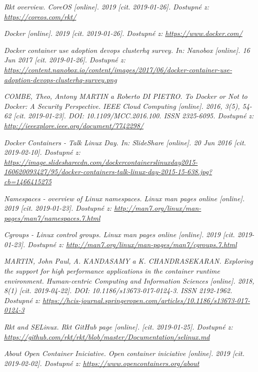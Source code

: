 \begin{thebibliography}{10}
	\emph{Rkt overview. CoreOS [online]. 2019 [cit. 2019-01-26]. Dostupné z: \url{https://coreos.com/rkt/}}

	\emph{Docker [online]. 2019 [cit. 2019-01-26]. Dostupné z: \url{https://www.docker.com/}}

	\emph{Docker container use adoption devops clusterhq survey. In: Nanobox [online]. 16 Jun 2017 [cit. 2019-01-26]. Dostupné z: \url{https://content.nanobox.io/content/images/2017/06/docker-container-use-adoption-devops-clusterhq-survey.png}}
	
	\emph{COMBE, Theo, Antony MARTIN a Roberto DI PIETRO. To Docker or Not to Docker: A Security Perspective. IEEE Cloud Computing [online]. 2016, 3(5), 54-62 [cit. 2019-01-23]. DOI: 10.1109/MCC.2016.100. ISSN 2325-6095. Dostupné z: \url{http://ieeexplore.ieee.org/document/7742298/}}

	\emph{Docker Containers - Talk Linux Day. In: SlideShare [online]. 20 Jun 2016 [cit. 2019-02-10]. Dostupné z: \url{https://image.slidesharecdn.com/dockercontainerslinuxday2015-160620093427/95/docker-containers-talk-linux-day-2015-15-638.jpg?cb=1466415275}}

	\emph{Namespaces - overview of Linux namespaces. Linux man pages online [online]. 2019 [cit. 2019-01-23]. Dostupné z: \url{http://man7.org/linux/man-pages/man7/namespaces.7.html}}

	\emph{Cgroups - Linux control groups. Linux man pages online [online]. 2019 [cit. 2019-01-23]. Dostupné z: \url{http://man7.org/linux/man-pages/man7/cgroups.7.html}}

	\emph{MARTIN, John Paul, A. KANDASAMY a K. CHANDRASEKARAN. Exploring the support for high performance applications in the container runtime environment. Human-centric Computing and Information Sciences [online]. 2018, 8(1) [cit. 2019-04-22]. DOI: 10.1186/s13673-017-0124-3. ISSN 2192-1962. Dostupné z: \url{https://hcis-journal.springeropen.com/articles/10.1186/s13673-017-0124-3}}

	\emph{Rkt and SELinux. Rkt GitHub page [online]. [cit. 2019-01-25]. Dostupné z: \url{https://github.com/rkt/rkt/blob/master/Documentation/selinux.md}}

	\emph{About Open Container Iniciative. Open container iniciative [online]. 2019 [cit. 2019-02-02]. Dostupné z: \url{https://www.opencontainers.org/about}}



\end{thebibliography}
